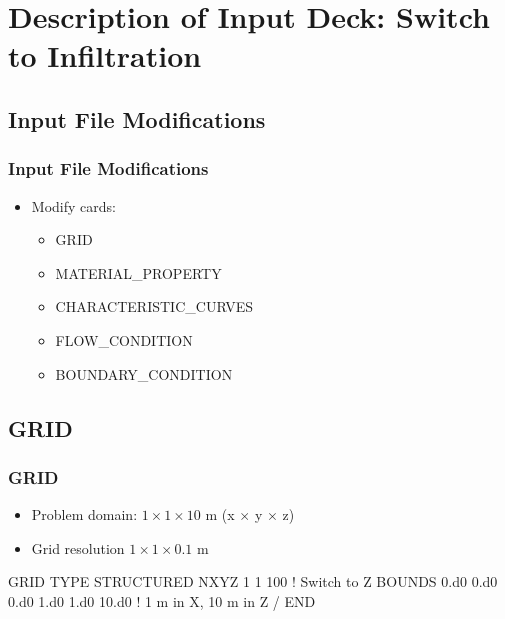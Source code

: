 \documentclass{beamer}
\newcommand\bluecomment[1]{{{\color{blue} #1}}}
\newcommand\magentacomment[1]{{{\color{magenta} #1}}}
\begin{document}
\section{Description of Input Deck: Switch to Infiltration}

\subsection{Input File Modifications}

\begin{frame}[fragile]\frametitle{Input File Modifications}

\begin{itemize}
\item Modify cards:
  \begin{itemize}
    \item GRID
    \item MATERIAL\_PROPERTY
    \item CHARACTERISTIC\_CURVES
    \item FLOW\_CONDITION
    \item BOUNDARY\_CONDITION
   \end{itemize}
\end{itemize}

\end{frame}

\subsection{GRID}
\begin{frame}\frametitle{GRID}

\begin{itemize}
  \item Problem domain: $1 \times 1 \times 10$ m (x $\times$ y $\times$ z)
  \item Grid resolution $1 \times 1 \times 0.1$ m
\end{itemize}

\begin{semiverbatim}
GRID
  TYPE STRUCTURED
  NXYZ \magentacomment{1} 1 \magentacomment{100}     \bluecomment{! Switch to Z}
  BOUNDS
    0.d0 0.d0 0.d0
    \magentacomment{1.d0} 1.d0 \magentacomment{10.d0}  \bluecomment{! 1 m in X, 10 m in Z}
  /
END
\end{semiverbatim}

\end{frame}
\end{document}
